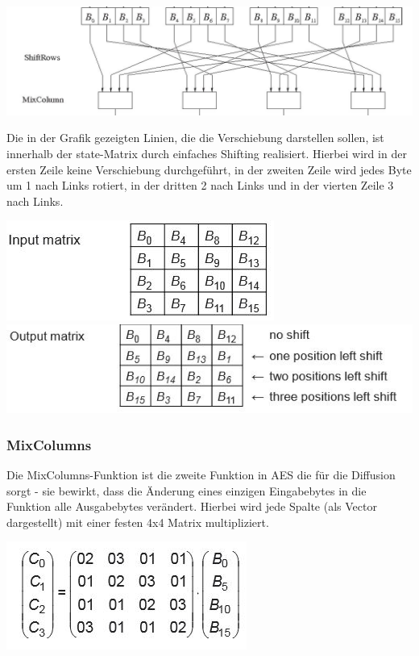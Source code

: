 \documentclass[10pt, a4paper,headsepline]{scrreprt}
\begin{document}
\includegraphics[scale=0.5]{aes_Shift_Row.JPG} 
\hfill

Die in der Grafik gezeigten Linien, die die Verschiebung darstellen sollen, ist innerhalb der state-Matrix durch einfaches Shifting realisiert. Hierbei wird in der ersten Zeile keine Verschiebung durchgeführt, in der zweiten Zeile wird jedes Byte um 1 nach Links rotiert, in der dritten 2 nach Links und in der vierten Zeile 3 nach Links. 

\includegraphics[scale=0.5]{shift_row_before.JPG}
\includegraphics[scale=0.5]{shift_row_after.JPG} 
\hfill


\subsubsection{MixColumns}
Die MixColumns-Funktion ist die zweite Funktion in AES die für die Diffusion sorgt - sie bewirkt, dass die Änderung eines einzigen Eingabebytes in die Funktion alle Ausgabebytes verändert. Hierbei wird jede Spalte (als Vector dargestellt) mit einer festen 4x4 Matrix multipliziert. 

\includegraphics[scale=0.5]{aes_mixcol.JPG}
\hfill
\end{document}
